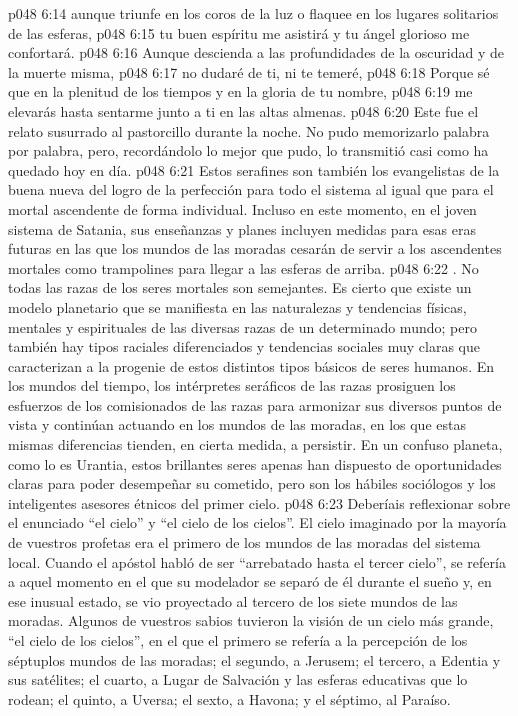 \vs p048 6:14 aunque triunfe en los coros de la luz o flaquee en los lugares solitarios de las esferas,
\vs p048 6:15 tu buen espíritu me asistirá y tu ángel glorioso me confortará.
\vs p048 6:16 Aunque descienda a las profundidades de la oscuridad y de la muerte misma,
\vs p048 6:17 no dudaré de ti, ni te temeré,
\vs p048 6:18 Porque sé que en la plenitud de los tiempos y en la gloria de tu nombre,
\vs p048 6:19 me elevarás hasta sentarme junto a ti en las altas almenas.
\vs p048 6:20 \pc Este fue el relato susurrado al pastorcillo durante la noche. No pudo memorizarlo palabra por palabra, pero, recordándolo lo mejor que pudo, lo transmitió casi como ha quedado hoy en día.
\vs p048 6:21 Estos serafines son también los evangelistas de la buena nueva del logro de la perfección para todo el sistema al igual que para el mortal ascendente de forma individual. Incluso en este momento, en el joven sistema de Satania, sus enseñanzas y planes incluyen medidas para esas eras futuras en las que los mundos de las moradas cesarán de servir a los ascendentes mortales como trampolines para llegar a las esferas de arriba.
\vs p048 6:22 . No todas las razas de los seres mortales son semejantes. Es cierto que existe un modelo planetario que se manifiesta en las naturalezas y tendencias físicas, mentales y espirituales de las diversas razas de un determinado mundo; pero también hay tipos raciales diferenciados y tendencias sociales muy claras que caracterizan a la progenie de estos distintos tipos básicos de seres humanos. En los mundos del tiempo, los intérpretes seráficos de las razas prosiguen los esfuerzos de los comisionados de las razas para armonizar sus diversos puntos de vista y continúan actuando en los mundos de las moradas, en los que estas mismas diferencias tienden, en cierta medida, a persistir. En un confuso planeta, como lo es Urantia, estos brillantes seres apenas han dispuesto de oportunidades claras para poder desempeñar su cometido, pero son los hábiles sociólogos y los inteligentes asesores étnicos del primer cielo.
\vs p048 6:23 \pc Deberíais reflexionar sobre el enunciado “el cielo” y “el cielo de los cielos”. El cielo imaginado por la mayoría de vuestros profetas era el primero de los mundos de las moradas del sistema local. Cuando el apóstol habló de ser “arrebatado hasta el tercer cielo”, se refería a aquel momento en el que su modelador se separó de él durante el sueño y, en ese inusual estado, se vio proyectado al tercero de los siete mundos de las moradas. Algunos de vuestros sabios tuvieron la visión de un cielo más grande, “el cielo de los cielos”, en el que el primero se refería a la percepción de los séptuplos mundos de las moradas; el segundo, a Jerusem; el tercero, a Edentia y sus satélites; el cuarto, a Lugar de Salvación y las esferas educativas que lo rodean; el quinto, a Uversa; el sexto, a Havona; y el séptimo, al Paraíso.
